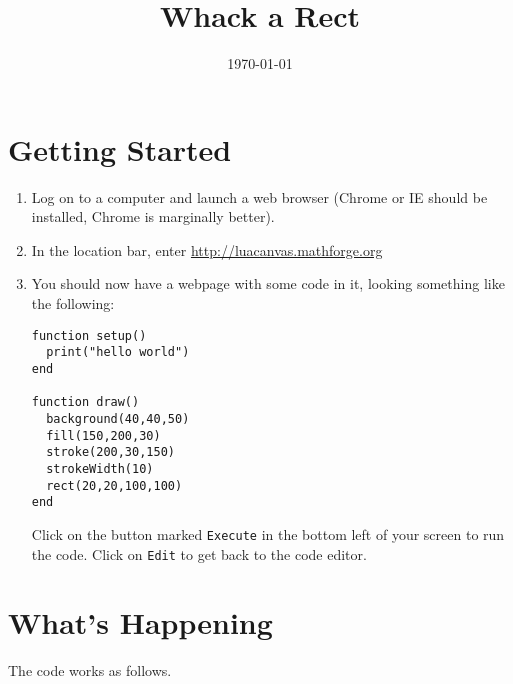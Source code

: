 \documentclass[
  xhtml,%
  use filename%
]{internet}
\title{Whack a Rect}
\date{\today}
\begin{document}
\maketitle

\section{Getting Started}

\begin{enumerate}
\item Log on to a computer and launch a web browser (Chrome or IE should be installed, Chrome is marginally better).
\item In the location bar, enter \href{http://luacanvas.mathforge.org}{http://luacanvas.mathforge.org}
\item You should now have a webpage with some code in it, looking something like the following:

\begin{verbatim}
function setup()
  print("hello world")
end

function draw()
  background(40,40,50)
  fill(150,200,30)
  stroke(200,30,150)
  strokeWidth(10)
  rect(20,20,100,100)
end
\end{verbatim}

Click on the button marked \verb+Execute+ in the bottom left of your screen to run the code.
Click on \verb+Edit+ to get back to the code editor.
\end{enumerate}

\section{What's Happening}

The code works as follows.
\end{document}
